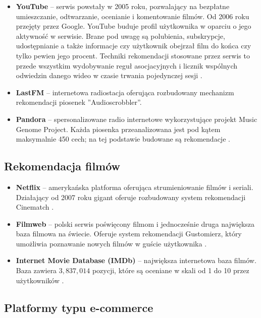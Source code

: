 \documentclass[twoside]{iisthesis}
\begin{document}
		 \begin{itemize}
		 	\item \textbf{YouTube} -- serwis powstały w 2005 roku, pozwalający na bezpłatne umieszczanie, odtwarzanie, ocenianie i komentowanie filmów. Od 2006 roku przejęty przez Google. YouTube buduje profil użytkownika w oparciu o jego aktywność w serwisie. Brane pod uwagę są polubienia, subskrypcje, udostępnianie a także informacje czy użytkownik obejrzał film do końca czy tylko pewien jego procent. Techniki rekomendacji stosowane przez serwis to przede wszystkim wydobywanie reguł asocjacyjnych i licznik wspólnych odwiedzin danego wideo w czasie trwania pojedynczej sesji \cite{id:TheYouTubeVideoRecommendationSystem}. 
		 	\item \textbf{LastFM } -- internetowa radiostacja oferująca rozbudowany mechanizm rekomendacji piosenek ''Audioscrobbler''.   
		 	\item \textbf{Pandora}	-- spersonalizowane radio internetowe wykorzystujące projekt Music Genome Project. Każda piosenka przeanalizowana jest pod kątem maksymalnie 450 cech; na tej podstawie budowane są rekomendacje \cite{id:mgp}.
	
		 \end{itemize}
	 
		 \subsection{Rekomendacja filmów}
		 \begin{itemize}
			 \item \textbf{Netflix} -- amerykańska platforma oferująca strumieniowanie filmów i seriali. Działający od 2007 roku gigant oferuje rozbudowany system rekomendacji Cinematch \cite{id:aStreamOfMovies}. 
			 \item \textbf{Filmweb} -- polski serwis poświęcony filmom i jednocześnie druga największa baza filmowa na świecie. Oferuje system rekomendacji Gustomierz, który umożliwia poznawanie nowych filmów w guście użytkownika \cite{id:filmwebfaq}.
			 \item \textbf{Internet Movie Database (IMDb)} -- największa internetowa baza filmów. Baza zawiera $3,837,014$ pozycji, które są oceniane w skali od 1 do 10 przez użytkowników \cite{id:imdbstats}.
		 \end{itemize}
		 
		 \subsection{Platformy typu e-commerce}
	
\end{document}
